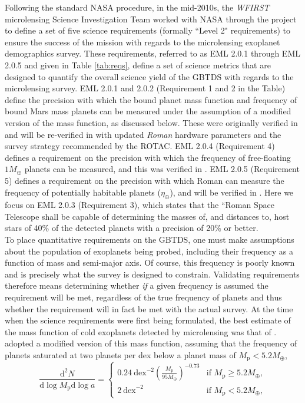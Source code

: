 \documentclass[twocolumn]{aastex631}
\newcommand{\mpl}{M_{\mathrm{p}}}      %
\newcommand{\mearth}{M_{\oplus}}       %
\newcommand{\dd}{\mathrm{d}}
\begin{document}
Following the standard NASA procedure, in the mid-2010s, the \textit{WFIRST} microlensing Science Investigation Team worked with NASA through the project to define a set of five science requirements (formally ``Level 2" requirements) to ensure the success of the mission with regards to the microlensing exoplanet demographics survey. These requirements, referred to as EML 2.0.1 through EML 2.0.5 and given in Table \ref{tab:reqs}, define a set of science metrics that are designed to quantify the overall science yield of the GBTDS with regards to the microlensing survey. EML 2.0.1 and 2.0.2 (Requirement 1 and 2 in the Table) define the precision with which the bound planet mass function and frequency of bound Mars mass planets can be measured under the assumption of a modified version of the \cite{cassan:2012a} mass function, as discussed below. These were originally verified in \cite{penny19} and will be re-verified in \cite{zohrabi:inprep} with updated \textit{Roman} hardware parameters and the survey strategy recommended by the ROTAC. EML 2.0.4 (Requirement 4) defines a requirement on the precision with which the frequency of free-floating $1 M_\oplus$ planets can be measured, and this was verified in \cite{johnson:2020a}. EML 2.0.5 (Requirement 5) defines a requirement on the precision with which Roman can measure the frequency of potentially habitable planets ($\eta_\oplus$), and will be verified in \cite{crisp:inprep}. Here we focus on EML 2.0.3 (Requirement 3), which states that the ``Roman Space Telescope shall be capable of determining the masses of, and distances to, host stars of 40\% of the detected planets with a precision of 20\% or better. \\
\indent To place quantitative requirements on the GBTDS, one must make assumptions about the population of exoplanets being probed, including their frequency as a function of mass and semi-major axis. Of course, this frequency is poorly known and is precisely what the survey is designed to constrain. Validating requirements therefore means determining whether \emph{if} a given frequency is assumed the requirement will be met, regardless of the true frequency of planets and thus whether the requirement will in fact be met with the actual survey. At the time when the science requirements were first being formulated, the best estimate of the mass function of cold exoplanets detected by microlensing was that of \cite{cassan:2012a}. \cite{penny19} adopted a modified version of this mass function, assuming that the frequency of planets saturated at two planets per dex below a planet mass of $\mpl < 5.2 M_\oplus$,
{\small
\begin{equation}
\frac{\dd^2 N}{\dd \log \mpl \dd \log a} =
\left\{
\begin{array}{ll}
0.24\ \text{dex}^{-2} \left(\frac{\mpl}{95\mearth}\right)^{-0.73} & \text{if } \mpl \ge 5.2\mearth,\\
2\ \text{dex}^{-2} & \text{if } \mpl < 5.2\mearth,
\end{array}
\right.
\label{fiducialmf}
\end{equation}
}
\end{document}
